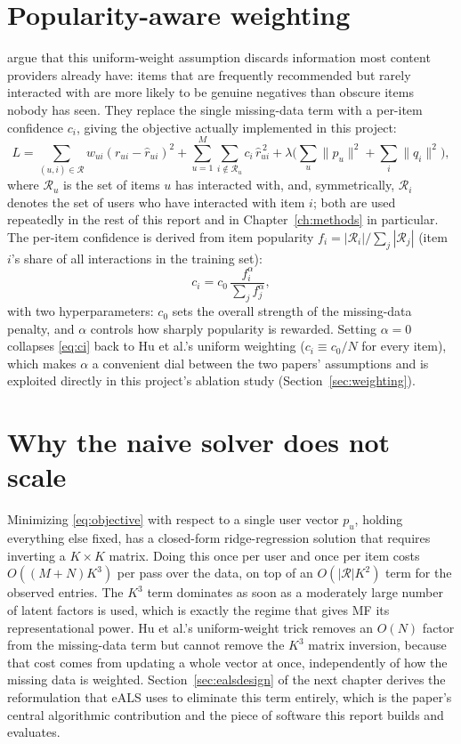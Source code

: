 \section{Popularity-aware weighting}
\label{sec:popweight}

\citet{he2016eals} argue that this uniform-weight assumption discards
information most content providers already have: items that are frequently
recommended but rarely interacted with are more likely to be genuine
negatives than obscure items nobody has seen. They replace the single
missing-data term with a per-item confidence $c_i$, giving the objective
actually implemented in this project:
\begin{equation}
  \label{eq:objective}
  L = \sum_{(u,i)\in\mathcal{R}} w_{ui}(r_{ui}-\hat r_{ui})^2
      + \sum_{u=1}^{M}\sum_{i \notin \mathcal{R}_u} c_i\, \hat r_{ui}^{\,2}
      + \lambda\Big(\sum_u \lVert p_u\rVert^2 + \sum_i \lVert q_i\rVert^2\Big),
\end{equation}
where $\mathcal{R}_u$ is the set of items $u$ has interacted with, and,
symmetrically, $\mathcal{R}_i$ denotes the set of users who have
interacted with item $i$; both are used repeatedly in the rest of this
report and in Chapter~\ref{ch:methods} in particular. The per-item
confidence is derived from item popularity $f_i = |\mathcal{R}_i|
/ \sum_j |\mathcal{R}_j|$ (item $i$'s share of all interactions in the
training set):
\begin{equation}
  \label{eq:ci}
  c_i = c_0\, \frac{f_i^{\alpha}}{\sum_{j} f_j^{\alpha}},
\end{equation}
with two hyperparameters: $c_0$ sets the overall strength of the
missing-data penalty, and $\alpha$ controls how sharply popularity is
rewarded. Setting $\alpha=0$ collapses \eqref{eq:ci} back to Hu et al.'s
uniform weighting ($c_i \equiv c_0/N$ for every item), which makes $\alpha$
a convenient dial between the two papers' assumptions and is exploited
directly in this project's ablation study (Section~\ref{sec:weighting}).

\section{Why the naive solver does not scale}

Minimizing \eqref{eq:objective} with respect to a single user vector $p_u$,
holding everything else fixed, has a closed-form ridge-regression solution
that requires inverting a $K \times K$ matrix. Doing this once per user and
once per item costs $O((M+N)K^3)$ per pass over the data, on top of an
$O(|\mathcal{R}|K^2)$ term for the observed entries. The $K^3$ term
dominates as soon as a moderately large number of latent factors is used,
which is exactly the regime that gives MF its representational power.
Hu et al.'s uniform-weight trick removes an $O(N)$ factor from the
missing-data term but cannot remove the $K^3$ matrix inversion, because
that cost comes from updating a whole vector at once, independently of how
the missing data is weighted. Section~\ref{sec:ealsdesign} of the next
chapter derives the reformulation that eALS uses to eliminate this term
entirely, which is the paper's central algorithmic contribution and the
piece of software this report builds and evaluates.

